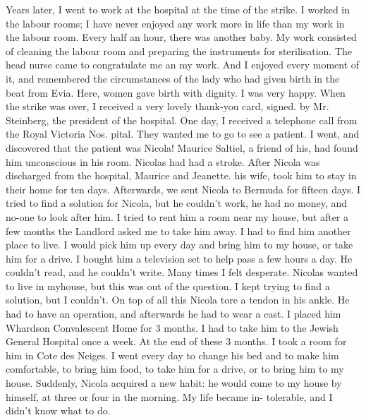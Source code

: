 Years later, I went to work at the hospital at the time of the 
strike. I worked in the labour rooms; I have never enjoyed any work more 
in life than my work in the labour room. Every half an hour, there 
was another baby. My work consisted of cleaning the labour room and preparing the instruments for sterilisation. The head nurse came to congratulate me an my work. And I enjoyed every moment of it, and remembered the circumstances of the lady who had given birth in the beat from Evia. 
Here, women gave birth with dignity. I was very happy. When the strike 
was over, I received a very lovely thank-you card, signed. by Mr. Steinberg, the president of the hospital. 
One day, I received a telephone call from the Royal Victoria Nos. 
pital. They wanted me to go to see a patient. I went, and discovered
that the patient was Nicola! Maurice Saltiel, a friend of his, had found 
him unconscious in his room. Nicolas had had a stroke. 
After Nicola was discharged from the hospital, Maurice and Jeanette. 
his wife, took him to stay in their home for ten days. Afterwards, we sent 
Nicola to Bermuda for fifteen days. I tried to find a solution for Nicola, 
but he couldn't work, he had no money, and no-one to look after him. 
I tried to rent him a room near my house, but after a few months the 
Landlord asked me to take him away. I had to find him another place to live.
I would pick him up every day and bring him to my house, or take 
him for a drive. I bought him a television set to help pass a few hours a day. 
He couldn't read, and he couldn't write. Many times I felt desperate.
Nicolas wanted to live in myhouse, but this was out of the question.
I kept trying to find a solution, but I couldn't. On top of all this 
Nicola tore a tendon in his ankle. He had to have an operation, and afterwards he had to wear a cast. I placed him 
Whardson Convalescent Home for 3 months. I had to take him to the 
Jewish General Hospital once a week. 
At the end of these 3 months. I took a room for him in Cote des 
Neiges. I went every day to change his bed and to make him comfortable, to bring him food, to take him for a drive, or to bring him to my house.
Suddenly, Nicola acquired a new habit: he would come to my
house by himself, at three or four in the morning. My life became in-
tolerable, and I didn't know what to do. 

